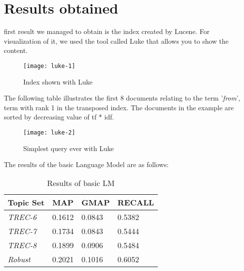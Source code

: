 \section{Results obtained}\label{sec:results}
 first result we managed to obtain is the index created by Lucene. For visualization of it, we used the tool called Luke that allows you to show the content.

\begin{figure}[H]
    \centering
    \texttt{[image: luke-1]}
    \caption[Index]{Index shown with Luke}
    \label{fig:index}
\end{figure}

The following table illustrates the first 8 documents relating to the term '\textit{from}', term with rank 1 in the transposed index. The documents in the example are sorted by decreasing value of tf * idf.

\begin{figure}[H]
    \centering
    \texttt{[image: luke-2]}
    \caption[Query]{Simplest query ever with Luke}
    \label{fig:query}
\end{figure}

The results of the basic Language Model are as follows:

\begin{table}[H]
    \centering
    \normalsize
    \begin{tabularx}{\columnwidth}{YYYY}
        \toprule
        \textbf{Topic Set} & \textbf{MAP} & \textbf{GMAP} & \textbf{RECALL}\\
        \midrule
        \textit{TREC-6} & 0.1612 & 0.0843 & 0.5382\\
        \midrule
        \textit{TREC-7} & 0.1734 & 0.0843 & 0.5444\\
        \midrule
        \textit{TREC-8} & 0.1899 & 0.0906 & 0.5484\\
        \midrule
        \textit{Robust} & 0.2021 & 0.1016 & 0.6052\\
        \bottomrule
    \end{tabularx}
    \caption{Results of basic LM}
    \label{tab:risultatiTestCollaudo}
\end{table}

